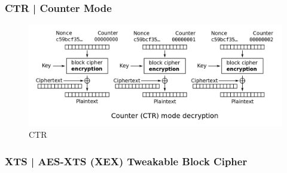 
\textsf{\small }

\subsubsection{CTR | Counter Mode}


\textsf{\small }

\begin{figure}[H]
	\centering
	\includegraphics[width=1\textwidth, height=1\textheight, keepaspectratio]{./images/aes_modes/ctr.png}
	\caption{CTR}
	\label{fig:ctr}
\end{figure}

\subsubsection{XTS | AES-XTS (XEX) Tweakable Block Cipher}




